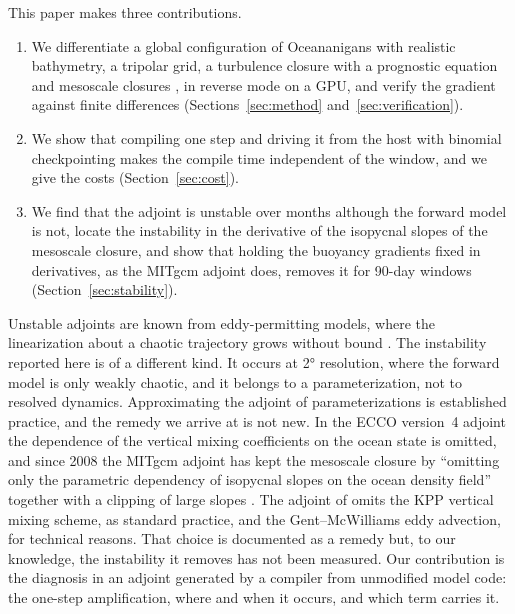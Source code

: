 \documentclass[11pt]{article}
\begin{document}
This paper makes three contributions.
\begin{enumerate}
  \item We differentiate a global configuration of Oceananigans \citep{ramadhan2020, wagner2025oceananigans} with
        realistic bathymetry, a tripolar grid, a turbulence closure with a prognostic equation \citep{wagner2025catke}
        and mesoscale closures \citep{gent1990, redi1982}, in reverse mode on a GPU, and verify the gradient against
        finite differences (Sections~\ref{sec:method} and~\ref{sec:verification}).
  \item We show that compiling one step and driving it from the host with binomial checkpointing
        \citep{griewank2000} makes the compile time independent of the window, and we give the costs
        (Section~\ref{sec:cost}).
  \item We find that the adjoint is unstable over months although the forward model is not, locate the instability
        in the derivative of the isopycnal slopes of the mesoscale closure, and show that holding the buoyancy
        gradients fixed in derivatives, as the MITgcm adjoint does, removes it for 90-day windows (Section~\ref{sec:stability}).
\end{enumerate}
Unstable adjoints are known from eddy-permitting models, where the linearization about a chaotic trajectory grows
without bound \citep{lea2000, kohl2002, hoteit2005}. The instability reported here is of a different kind. It occurs at
\ang{2} resolution, where the forward model is only weakly chaotic, and it belongs to a parameterization, not to
resolved dynamics. Approximating the adjoint of parameterizations is established practice, and the remedy we arrive at is not new.
In the ECCO version~4 adjoint the dependence of the vertical mixing coefficients on the ocean state is omitted,
and since 2008 the MITgcm adjoint has kept the mesoscale closure by ``omitting only the parametric dependency of
isopycnal slopes on the ocean density field'' together with a clipping of large slopes
\citep[their Section~4.2]{forget2015}. The adjoint of \citet{pillar2016} omits the KPP vertical mixing scheme, as
standard practice, and the Gent--McWilliams eddy advection, for technical reasons. That choice is documented as a remedy but, to our knowledge, the instability
it removes has not been measured. Our contribution is the diagnosis in an adjoint generated by a compiler from
unmodified model code: the one-step amplification, where and when it occurs, and which term carries it.
\end{document}

